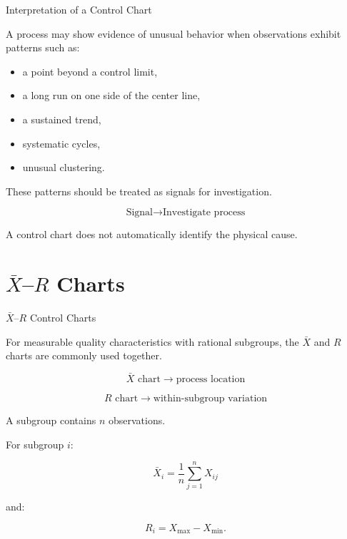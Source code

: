 \documentclass[aspectratio=169,10pt]{beamer}
\begin{document}

\begin{frame}[shrink=18]{Interpretation of a Control Chart}
\small

A process may show evidence of unusual behavior when observations
exhibit patterns such as:

\begin{itemize}
    \item a point beyond a control limit,
    \item a long run on one side of the center line,
    \item a sustained trend,
    \item systematic cycles,
    \item unusual clustering.
\end{itemize}

These patterns should be treated as signals for investigation.

\[
\boxed{
\text{Signal}\rightarrow\text{Investigate process}
}
\]

A control chart does not automatically identify the physical cause.

\end{frame}


\section{$\bar X$--$R$ Charts}

\begin{frame}[shrink=18]{$\bar X$--$R$ Control Charts}
\small

For measurable quality characteristics with rational subgroups,
the $\bar X$ and $R$ charts are commonly used together.

\[
\boxed{
\bar X\text{ chart}\rightarrow\text{process location}
}
\]

\[
\boxed{
R\text{ chart}\rightarrow\text{within-subgroup variation}
}
\]

A subgroup contains \(n\) observations.

For subgroup \(i\):

\[
\bar X_i=
\frac{1}{n}
\sum_{j=1}^{n}X_{ij}
\]

and:

\[
R_i=X_{\max}-X_{\min}.
\]

\end{frame}
\end{document}
